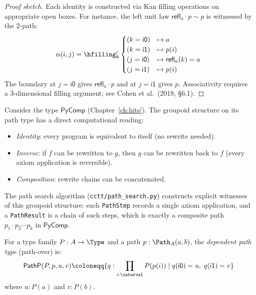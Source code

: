 \begin{proof}[Proof sketch]
Each identity is constructed via Kan filling operations on appropriate
open boxes.  For instance, the left unit law $\mathsf{refl}_a \cdot p \sim p$
is witnessed by the 2-path:
\[
  \alpha(i, j) = \hfilling^i_k
  \begin{cases}
    (k = \mathsf{i0}) &\mapsto a \\
    (k = \mathsf{i1}) &\mapsto p(i) \\
    (j = \mathsf{i0}) &\mapsto \mathsf{refl}_a(k) = a \\
    (j = \mathsf{i1}) &\mapsto p(i)
  \end{cases}
\]
The boundary at $j = \mathsf{i0}$ gives $\mathsf{refl}_a \cdot p$ and
at $j = \mathsf{i1}$ gives $p$.  Associativity requires a 3-dimensional
filling argument; see Cohen et al.~(2018, \S 6.1).
\end{proof}

\begin{example}
\label{ex:rewrite-groupoid}
Consider the type $\mathsf{PyComp}$ (Chapter~\ref{ch:hits}).  The groupoid
structure on its path type has a direct computational reading:
\begin{itemize}
  \item \emph{Identity}: every program is equivalent to itself
    (no rewrite needed).
  \item \emph{Inverse}: if $f$ can be rewritten to $g$, then $g$ can be
    rewritten back to $f$ (every axiom application is reversible).
  \item \emph{Composition}: rewrite chains can be concatenated.
\end{itemize}
The path search algorithm (\texttt{cctt/path\_search.py}) constructs
explicit witnesses of this groupoid structure: each \texttt{PathStep}
records a single axiom application, and a \texttt{PathResult} is a
chain of such steps, which is exactly a composite path
$p_1 \cdot p_2 \cdots p_k$ in $\mathsf{PyComp}$.
\end{example}

\begin{definition}
\label{def:dep-path}
For a type family $P : A \to \Type$ and a path $p : \Path_A(a, b)$,
the \emph{dependent path type} (path-over) is:
\[
  \mathsf{PathP}(P, p, u, v) \coloneqq \{q : \prod_{i : \interval} P(p(i))
  \mid q(\mathsf{i0}) = u,\; q(\mathsf{i1}) = v\}
\]
where $u : P(a)$ and $v : P(b)$.
\end{definition}

